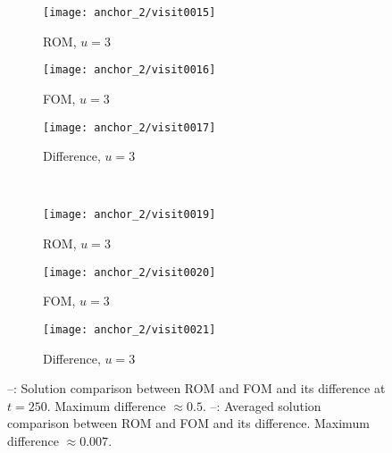 \begin{figure}[!h]
     \centering
     \begin{subfigure}[b]{0.3\textwidth}
         \centering
         \texttt{[image: anchor\_2/visit0015]}
         \caption{ROM, $u=3$}
         \label{fig:6_a}
     \end{subfigure}
     \hfill
     \begin{subfigure}[b]{0.3\textwidth}
         \centering
         \texttt{[image: anchor\_2/visit0016]}
         \caption{FOM, $u=3$}
         \label{fig:6_b}
     \end{subfigure}
     \hfill
     \begin{subfigure}[b]{0.3\textwidth}
         \centering
         \texttt{[image: anchor\_2/visit0017]}
         \caption{Difference, $u=3$}
         \label{fig:6_c}
     \end{subfigure}\\
     \begin{subfigure}[b]{0.3\textwidth}
         \centering
         \texttt{[image: anchor\_2/visit0019]}
         \caption{ROM, $u=3$}
         \label{fig:6_d}
     \end{subfigure}
     \hfill
     \begin{subfigure}[b]{0.3\textwidth}
         \centering
         \texttt{[image: anchor\_2/visit0020]}
         \caption{FOM, $u=3$}
         \label{fig:6_e}
     \end{subfigure}
     \hfill
     \begin{subfigure}[b]{0.3\textwidth}
         \centering
         \texttt{[image: anchor\_2/visit0021]}
         \caption{Difference, $u=3$}
         \label{fig:6_f}
     \end{subfigure} 
     \caption{--: Solution comparison between
     ROM and FOM and its difference at $t=250$. Maximum difference $\approx 0.5$.
     --: Averaged solution comparison between
     ROM and FOM and its difference. Maximum difference $\approx 0.007$.}
      \label{fig:6}
\end{figure}

